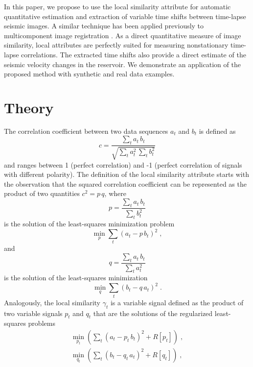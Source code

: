 In this paper, we propose to use the local similarity attribute
\cite[]{attr} for automatic quantitative estimation and extraction of
variable time shifts between time-lapse seismic images. A similar
technique has been applied previously to multicomponent image
registration \cite[]{warp}.  As a direct quantitative measure of image
similarity, local attributes are perfectly suited for measuring
nonstationary time-lapse correlations. The extracted time shifts
 also provide a direct estimate of the seismic velocity
changes in the reservoir. We demonstrate an application of the
proposed method with synthetic and real data examples.

\section{Theory}
The correlation coefficient between two data sequences $a_t$ and $b_t$
is defined as 
\begin{equation}
  \label{eq:c}
  c = \frac{\displaystyle \sum_t a_t\,b_t}{\displaystyle \sqrt{ \sum_t a_t^2\,\sum_t b_t^2}}
\end{equation}
and ranges between 1 (perfect correlation) and -1 (perfect correlation
of signals with different polarity). The definition of the local
similarity attribute \cite[]{attr} starts with the observation that
the squared correlation coefficient can be represented as the product
of two quantities $c^2 = p\,q$, where 
\[ 
p=\frac{\displaystyle \sum_t a_t\,b_t}{\displaystyle \sum_t b_t^2}
\]
is the solution of the least-squares minimization problem
\begin{equation}
  \label{eq:p}
  \min_p \sum_t \left(a_t - p\,b_t\right)^2\;,
\end{equation}
and 
\[
q = \frac{\displaystyle \sum_t a_t\,b_t}{\displaystyle \sum_t a_t^2}
\]
 is the solution of the least-squares minimization
\begin{equation}
  \label{eq:q}
  \min_q \sum_t \left(b_t - q\,a_t\right)^2\;.
\end{equation}
Analogously, the local similarity $\gamma_t$ is a variable signal
defined as the product of two variable signals $p_t$ and $q_t$ that
are the solutions of the regularized least-squares problems
\begin{eqnarray}
  \label{eq:pt}
  \min_{p_t} 
  \left(\sum\nolimits_t \left(a_t - p_t\,b_t\right)^2 + R\left[p_t\right]\right)\;, \\
   \label{eq:qt}
   \min_{q_t}
   \left(\sum\nolimits_t \left(b_t - q_t\,a_t\right)^2 + R\left[q_t\right]\right)\;,
\end{eqnarray}
